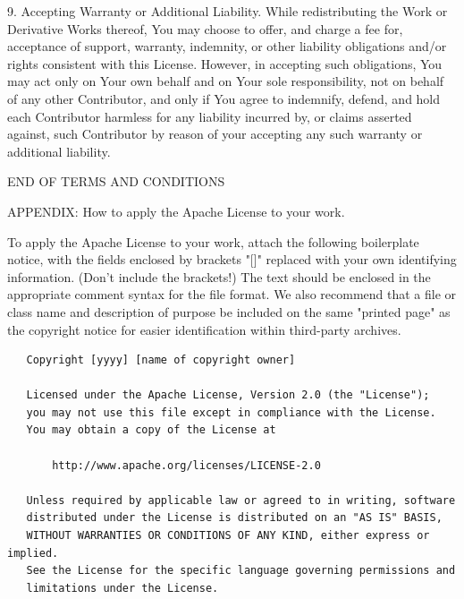 \documentclass[10pt]{article}
\begin{document}
   9. Accepting Warranty or Additional Liability. While redistributing
      the Work or Derivative Works thereof, You may choose to offer,
      and charge a fee for, acceptance of support, warranty, indemnity,
      or other liability obligations and/or rights consistent with this
      License. However, in accepting such obligations, You may act only
      on Your own behalf and on Your sole responsibility, not on behalf
      of any other Contributor, and only if You agree to indemnify,
      defend, and hold each Contributor harmless for any liability
      incurred by, or claims asserted against, such Contributor by reason
      of your accepting any such warranty or additional liability.

END OF TERMS AND CONDITIONS

   APPENDIX: How to apply the Apache License to your work.

      To apply the Apache License to your work, attach the following
      boilerplate notice, with the fields enclosed by brackets "[]"
      replaced with your own identifying information. (Don't include
      the brackets!)  The text should be enclosed in the appropriate
      comment syntax for the file format. We also recommend that a
      file or class name and description of purpose be included on the
      same "printed page" as the copyright notice for easier
      identification within third-party archives.

\begin{verbatim}
   Copyright [yyyy] [name of copyright owner]

   Licensed under the Apache License, Version 2.0 (the "License");
   you may not use this file except in compliance with the License.
   You may obtain a copy of the License at

       http://www.apache.org/licenses/LICENSE-2.0

   Unless required by applicable law or agreed to in writing, software
   distributed under the License is distributed on an "AS IS" BASIS,
   WITHOUT WARRANTIES OR CONDITIONS OF ANY KIND, either express or implied.
   See the License for the specific language governing permissions and
   limitations under the License.
\end{verbatim}
\end{document}
